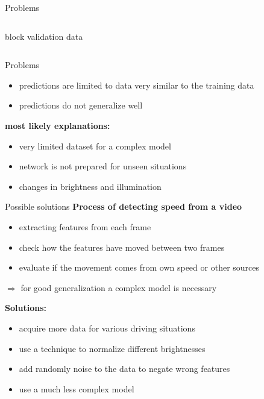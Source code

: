 \begin{frame}{Problems}
\begin{columns}[c]
\begin{column}{0.5\textwidth}
\begin{center}
		block validation data
		\end{center}
	\end{column}
\end{columns}
\end{frame}

\begin{frame}{Problems}
\begin{itemize}
	\item predictions are limited to data very similar to the training data
	\item predictions do not generalize well
\end{itemize}
\textbf{most likely explanations:}
\begin{itemize}
	\item very limited dataset for a complex model
	\item network is not prepared for unseen situations
	\item changes in brightness and illumination
\end{itemize}
\end{frame}

\begin{frame}{Possible solutions}
\textbf{Process of detecting speed from a video}
\begin{itemize}
	\item extracting features from each frame
	\item check how the features have moved between two frames
	\item evaluate if the movement comes from own speed or other sources
\end{itemize}

$\Rightarrow$ for good generalization a complex model is necessary

\textbf{Solutions:}
\begin{itemize}
	\item acquire more data for various driving situations
	\item use a technique to normalize different brightnesses
	\item add randomly noise to the data to negate wrong features
	\item use a much less complex model
\end{itemize}
\end{frame}

